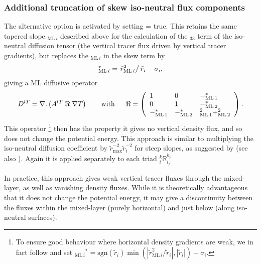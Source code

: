\documentclass[../main/NEMO_manual]{subfiles}
\newcommand{\rML}[1][i]{\ensuremath{_{\mathrm{ML}\,#1}}}
\newcommand{\rMLt}[1][i]{\tilde{r}_{\mathrm{ML}\,#1}}
\begin{document}
\subsubsection{Additional truncation of skew iso-neutral flux components}
\label{subsec:Gerdes-taper}

The alternative option is activated by setting  = true.
This retains the same tapered slope $\rML$  described above for the calculation of the $_{33}$ term of
the iso-neutral diffusion tensor (the vertical tracer flux driven by vertical tracer gradients),
but replaces the $\rML$ in the skew term by
\begin{equation}
  \label{eq:rm*}
  \rML^*=\left.\rMLt^2\right/\tilde{r}_i-\sigma_i,
\end{equation}
giving a ML diffusive operator
\[
  D^{lT}=\nabla {\rm {\bf .}}\left( {A^{lT}\;\Re \;\nabla T} \right) \qquad
  \mbox{with}\quad \;\;\Re =\left( {{
        \begin{array}{*{20}c}
          1 \hfill & 0 \hfill & {-\rML[1]^*}\hfill \\
          0 \hfill & 1 \hfill & {-\rML[2]^*} \hfill \\
          {-\rML[1]^*}\hfill &   {-\rML[2]^*} \hfill & {\rML[1]^2+\rML[2]^2} \hfill \\
        \end{array}
      }} \right).
\]
This operator
\footnote{
  To ensure good behaviour where horizontal density gradients are weak,
  we in fact follow \citet{Gerdes1991} and
  set $\rML^*=\mathrm{sgn}(\tilde{r}_i)\min(|\rMLt^2/\tilde{r}_i|,|\tilde{r}_i|)-\sigma_i$.
}
then has the property it gives no vertical density flux, and so does not change the potential energy.
This approach is similar to multiplying the iso-neutral diffusion coefficient by
$\tilde{r}_{\mathrm{max}}^{-2}\tilde{r}_i^{-2}$ for steep slopes,
as suggested by \citet{Gerdes1991} (see also \citet{Griffies_Bk04}).
Again it is applied separately to each triad $_i^k\mathbb{R}_{i_p}^{k_p}$

In practice, this approach gives weak vertical tracer fluxes through the mixed-layer,
as well as vanishing density fluxes.
While it is theoretically advantageous that it does not change the potential energy,
it may give a discontinuity between the fluxes within the mixed-layer (purely horizontal) and
just below (along iso-neutral surfaces).
\end{document}
